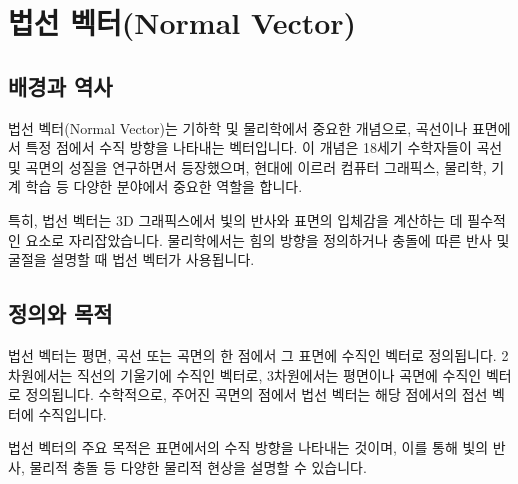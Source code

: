 \section{법선 벡터(Normal Vector)}

\subsection{배경과 역사}
법선 벡터(Normal Vector)는 기하학 및 물리학에서 중요한 개념으로, 곡선이나 표면에서 특정 점에서 수직 방향을 나타내는 벡터입니다. 이 개념은 18세기 수학자들이 곡선 및 곡면의 성질을 연구하면서 등장했으며, 현대에 이르러 컴퓨터 그래픽스, 물리학, 기계 학습 등 다양한 분야에서 중요한 역할을 합니다.

\vspace{1\baselineskip}
\noindent 특히, 법선 벡터는 3D 그래픽스에서 빛의 반사와 표면의 입체감을 계산하는 데 필수적인 요소로 자리잡았습니다. 물리학에서는 힘의 방향을 정의하거나 충돌에 따른 반사 및 굴절을 설명할 때 법선 벡터가 사용됩니다.

\subsection{정의와 목적}
법선 벡터는 평면, 곡선 또는 곡면의 한 점에서 그 표면에 수직인 벡터로 정의됩니다. 2차원에서는 직선의 기울기에 수직인 벡터로, 3차원에서는 평면이나 곡면에 수직인 벡터로 정의됩니다. 수학적으로, 주어진 곡면의 점에서 법선 벡터는 해당 점에서의 접선 벡터에 수직입니다.

\vspace{1\baselineskip}
\noindent 법선 벡터의 주요 목적은 표면에서의 수직 방향을 나타내는 것이며, 이를 통해 빛의 반사, 물리적 충돌 등 다양한 물리적 현상을 설명할 수 있습니다.

